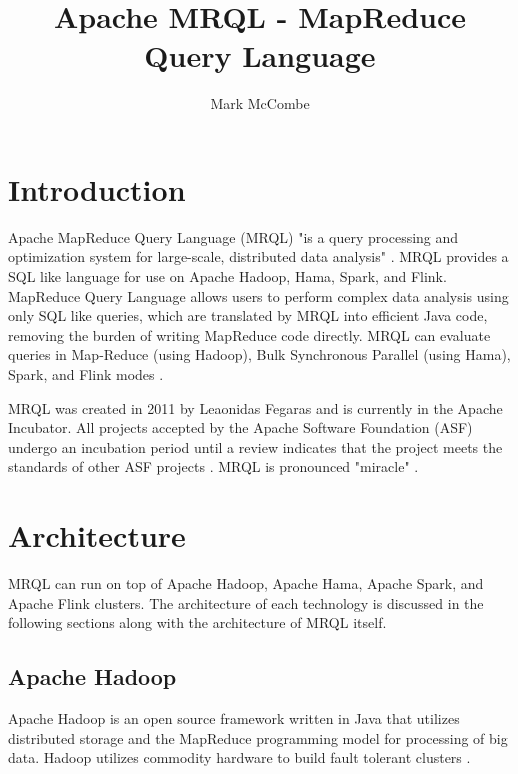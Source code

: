 \documentclass[9pt,twocolumn,twoside]{../../styles/osajnl}
\title{Apache MRQL - MapReduce Query Language}
\author[1,*]{Mark McCombe}
\affil[1]{School of Informatics and Computing, Bloomington, IN 47408, U.S.A.}
\affil[*]{Corresponding authors: mmccombe@iu.edu}
\begin{document}
\maketitle

\section{Introduction}

Apache MapReduce Query Language (MRQL) "is a query processing and optimization system for large-scale, distributed data analysis" \cite{www-apacheincubator}. MRQL provides a SQL like language for use on Apache Hadoop, Hama, Spark, and Flink. MapReduce Query Language allows users to perform complex data analysis using only SQL like queries, which are translated by MRQL into efficient Java code, removing the burden of writing MapReduce code directly. MRQL can evaluate queries in Map-Reduce (using Hadoop), Bulk Synchronous Parallel (using Hama), Spark, and Flink modes \cite{www-apacheincubator}.

MRQL was created in 2011 by Leaonidas Fegaras \cite{www-mrqlhadoop} and is currently in the Apache Incubator. All projects accepted by the Apache Software Foundation (ASF) undergo an incubation period until a review indicates that the project meets the standards of other ASF projects \cite{www-apachemrql}.  MRQL is pronounced "miracle" \cite{www-apacheincubator}.

\section{Architecture}

MRQL can run on top of Apache Hadoop, Apache Hama, Apache Spark, and Apache Flink clusters.  The architecture of each technology is discussed in the following sections along with the architecture of MRQL itself. 





\subsection{Apache Hadoop}

Apache Hadoop is an open source framework written in Java that utilizes distributed storage and the MapReduce programming model for processing of big data. Hadoop utilizes commodity hardware to build fault tolerant clusters \cite{www-wikihadoop}. 
\end{document}
